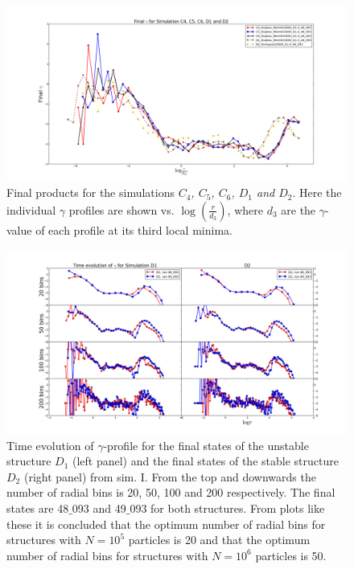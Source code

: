 \begin{figure}
\centering
\includegraphics[width=1.0\linewidth]{img/C4C5C6D1D2_gamma_d3.png}
\caption{Final products for the simulations \emph{$C_4$, $C_5$, $C_6$, $D_1$ and $D_2$}.
Here the individual $\gamma$ profiles are shown vs. $\log ( \frac{r}{d_3})$, where $d_3$ are the $\gamma$-value of each profile at its third local minima. }
\label{fig:test}
\end{figure}

\begin{figure}
\centering
\includegraphics[width=1.0\linewidth]{img/D1D2_gamma_logr_panel.png}
\caption{Time evolution of $\gamma$-profile for the final states of the unstable structure $D_1$ (left panel) and the final states of the stable structure $D_2$ (right panel) from sim. I. From the top and downwards the number of radial bins is 20, 50, 100 and 200 respectively. The final states are 48$\_$093
and 49$\_$093 for both structures. From plots like these it is concluded that the optimum number of radial bins for structures with $N = 10^5$ particles is 20 and that the optimum number of radial bins for structures with $N = 10^6$ particles is 50.}
\label{fig:test}
\end{figure}

